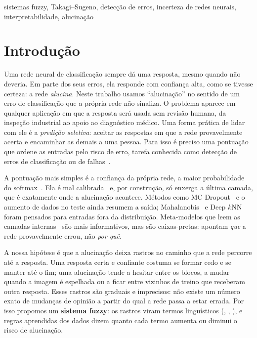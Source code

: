 \begin{abstract}
\end{abstract}

\begin{IEEEkeywords}
sistemas fuzzy, Takagi--Sugeno, detecção de erros, incerteza de redes neurais, interpretabilidade, alucinação
\end{IEEEkeywords}

\section{Introdução}

Uma rede neural de classificação sempre dá uma resposta, mesmo quando não deveria. Em parte dos seus erros, ela responde com confiança alta,
como se tivesse certeza: a rede \emph{alucina}. Neste trabalho usamos ``alucinação'' no sentido de um erro de classificação que a própria
rede não sinaliza. O problema aparece em qualquer aplicação em que a resposta será usada sem revisão humana, da inspeção industrial ao apoio
ao diagnóstico médico. Uma forma prática de lidar com ele é a \emph{predição seletiva}: aceitar as respostas em que a rede provavelmente
acerta e encaminhar as demais a uma pessoa. Para isso é preciso uma pontuação que ordene as entradas pelo risco de erro, tarefa conhecida
como detecção de erros de classificação ou de falhas~\cite{hendrycks2017,jaeger2023}.

A pontuação mais simples é a confiança da própria rede, a maior probabilidade do softmax~\cite{hendrycks2017}. Ela é mal calibrada~\cite{guo2017}
e, por construção, só enxerga a última camada, que é exatamente onde a alucinação acontece. Métodos como MC Dropout~\cite{gal2016} e o aumento
de dados no teste ainda resumem a saída; Mahalanobis~\cite{lee2018} e Deep $k$NN~\cite{papernot2018} foram pensados para entradas fora da
distribuição. Meta-modelos que leem as camadas internas~\cite{chen2019,font2025,gorbett2022} são mais informativos, mas são caixas-pretas:
apontam \emph{que} a rede provavelmente errou, não \emph{por quê}.

A nossa hipótese é que a alucinação deixa rastros no caminho que a rede percorre até a resposta. Uma resposta certa e confiante costuma se
formar cedo e se manter até o fim; uma alucinação tende a hesitar entre os blocos, a mudar quando a imagem é espelhada ou a ficar entre
vizinhos de treino que receberam outra resposta. Esses rastros são graduais e imprecisos: não existe um número exato de mudanças de opinião
a partir do qual a rede passa a estar errada. Por isso propomos um \textbf{sistema fuzzy}: os rastros viram termos linguísticos (,
, ), e regras aprendidas dos dados dizem quanto cada termo aumenta ou diminui o risco de alucinação.

